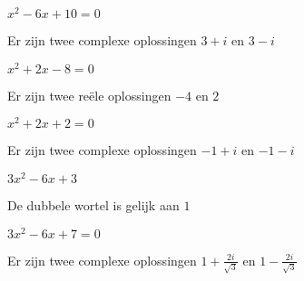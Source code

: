 \documentclass{ximera}
\begin{document}
\begin{exercise}
    
    
    \begin{question} \(  x^2 - 6x + 10 = 0   \) \begin{uitkomst} Er zijn twee complexe oplossingen  \(  3 + i                              \) en  \(  3 - i                              \) \end{uitkomst} \end{question}
    \begin{question} \( x^2 + 2x - 8    = 0  \) \begin{uitkomst} Er zijn twee reële oplossingen  \( -4 \) en \( 2 \)           \end{uitkomst} \end{question}
    \begin{question} \(  x^2 + 2x + 2 = 0    \) \begin{uitkomst} Er zijn twee complexe oplossingen  \( -1 + i                              \) en  \( -1 - i                              \) \end{uitkomst} \end{question}
    \begin{question} \( 3x^2 - 6x + 3        \) \begin{uitkomst} De dubbele wortel is gelijk aan    \(  1                                                                                \) \end{uitkomst} \end{question}
    \begin{question} \(  3x^2 - 6x + 7 = 0   \) \begin{uitkomst} Er zijn twee complexe oplossingen  \(  1 + \frac{2i}{\sqrt{3}}            \) en  \(  1 - \frac{2i}{\sqrt{3}}            \) \end{uitkomst} \end{question}
\end{exercise}
\end{document}

